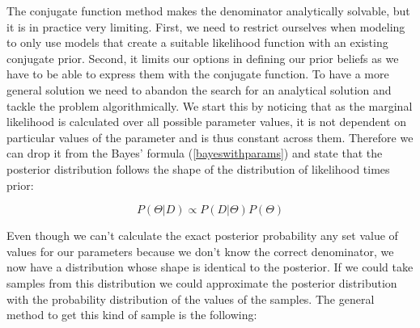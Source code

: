 \documentclass[12pt,a4paper,leqno]{report}
\theoremstyle{plain}
\theoremstyle{definition}
\theoremstyle{remark}
\begin{document}
The conjugate function method makes the denominator analytically solvable, but it
is in practice very limiting. First, we need to restrict ourselves when
modeling to only use models that create a suitable likelihood function with an existing conjugate prior. Second, it limits our options in defining our prior
beliefs as we have to be able to express them with the conjugate function. To
have a more general solution we need to abandon the search for an analytical
solution and tackle the problem algorithmically. We start this by noticing that
as the marginal likelihood is calculated over all possible parameter values, it is
not dependent on particular values of the parameter and is thus constant across
them. Therefore we can drop it from the Bayes' formula (\ref{bayeswithparams}) and state that the posterior
distribution follows the shape of the distribution of likelihood times prior:

\begin{def}\label{bayespropto}
    \begin{equation}
        P(\Theta|D) \propto P(D|\Theta)P(\Theta)
    \end{equation}
\end{def}

Even though we can't calculate the exact posterior probability any set value of
values for our parameters because we don't know the correct denominator, we now
have a distribution whose shape is identical to the posterior. If we could take
samples from this distribution we could approximate the posterior distribution
with the probability distribution of the values of the samples. The general
method to get this kind of sample is the following:
\end{document}
